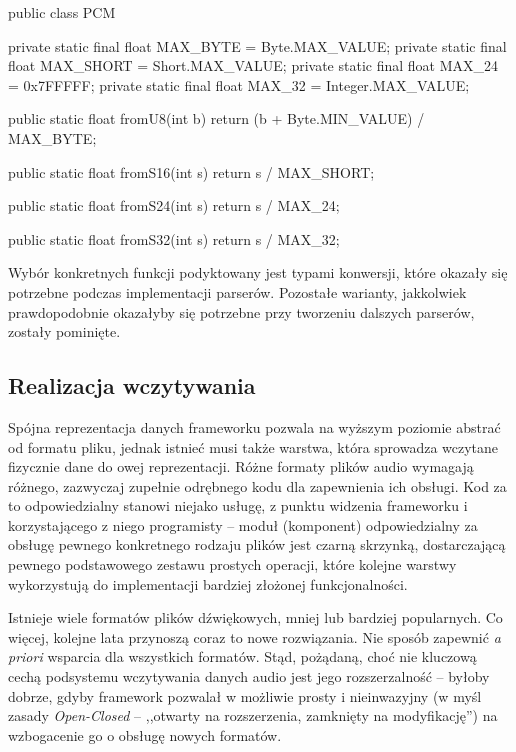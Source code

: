\begin{java}
public class PCM {

    private static final float MAX_BYTE = Byte.MAX_VALUE;
    private static final float MAX_SHORT = Short.MAX_VALUE;
    private static final float MAX_24 = 0x7FFFFF;
    private static final float MAX_32 = Integer.MAX_VALUE;

    public static float fromU8(int b) {
        return (b + Byte.MIN_VALUE) / MAX_BYTE;
    }

    public static float fromS16(int s) {
        return s / MAX_SHORT;
    }
    
    public static float fromS24(int s) {
        return s / MAX_24;
    }
    
    public static float fromS32(int s) {
        return s / MAX_32;
    }

}
\end{java}

Wybór konkretnych funkcji podyktowany jest typami konwersji, które okazały się potrzebne podczas
implementacji parserów. Pozostałe warianty, jakkolwiek prawdopodobnie okazałyby się potrzebne przy
tworzeniu dalszych parserów, zostały pominięte.


\subsection{Realizacja wczytywania}

Spójna reprezentacja danych frameworku pozwala na wyższym poziomie abstrać od formatu pliku, jednak
istnieć musi także warstwa, która sprowadza wczytane fizycznie dane do owej reprezentacji. Różne
formaty plików audio wymagają różnego, zazwyczaj zupełnie odrębnego kodu dla zapewnienia ich
obsługi. Kod za to odpowiedzialny stanowi niejako usługę, z punktu widzenia frameworku i
korzystającego z niego programisty -- moduł (komponent) odpowiedzialny za obsługę pewnego
konkretnego rodzaju plików jest czarną skrzynką, dostarczającą pewnego podstawowego zestawu prostych
operacji, które kolejne warstwy wykorzystują do implementacji bardziej złożonej funkcjonalności.

Istnieje wiele formatów plików dźwiękowych, mniej lub bardziej popularnych. Co więcej, kolejne lata
przynoszą coraz to nowe rozwiązania. Nie sposób zapewnić \textit{a priori} wsparcia dla wszystkich
formatów. Stąd, pożądaną, choć nie kluczową cechą podsystemu wczytywania danych audio jest jego
rozszerzalność -- byłoby dobrze, gdyby framework pozwalał w możliwie prosty i nieinwazyjny (w myśl
zasady \emph{Open-Closed} -- ,,otwarty na rozszerzenia, zamknięty na modyfikację'') na wzbogacenie
go o obsługę nowych formatów.

